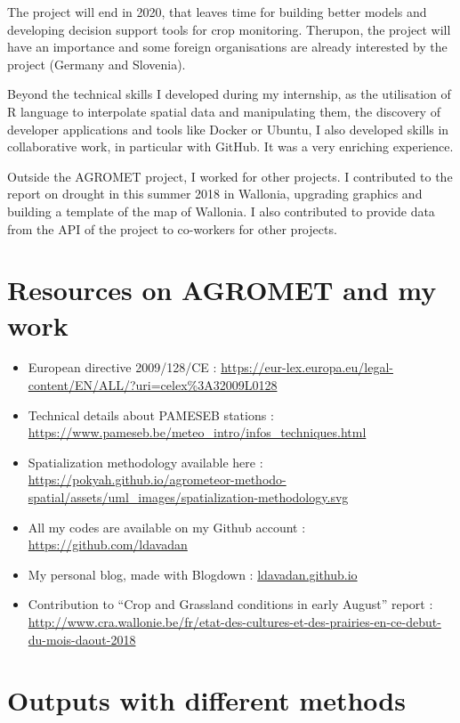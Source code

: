 \documentclass[12pt,twoside]{reedthesis}
\theoremstyle{definition}
\theoremstyle{definition}
\theoremstyle{definition}
\theoremstyle{remark}
\begin{document}
The project will end in 2020, that leaves time for building better
models and developing decision support tools for crop monitoring.
Therupon, the project will have an importance and some foreign
organisations are already interested by the project (Germany and
Slovenia).

Beyond the technical skills I developed during my internship, as the
utilisation of R language to interpolate spatial data and manipulating
them, the discovery of developer applications and tools like Docker or
Ubuntu, I also developed skills in collaborative work, in particular
with GitHub. It was a very enriching experience.

Outside the AGROMET project, I worked for other projects. I contributed
to the report on drought in this summer 2018 in Wallonia, upgrading
graphics and building a template of the map of Wallonia. I also
contributed to provide data from the API of the project to co-workers
for other projects.

\appendix

\chapter{Resources on AGROMET and my
work}\label{resources-on-agromet-and-my-work}
\begin{itemize}
\item
  European directive 2009/128/CE :
  \url{https://eur-lex.europa.eu/legal-content/EN/ALL/?uri=celex\%3A32009L0128}
\item
  Technical details about PAMESEB stations :
  \url{https://www.pameseb.be/meteo_intro/infos_techniques.html}
\item
  Spatialization methodology available here :
  \url{https://pokyah.github.io/agrometeor-methodo-spatial/assets/uml_images/spatialization-methodology.svg}
\item
  All my codes are available on my Github account :
  \url{https://github.com/ldavadan}
\item
  My personal blog, made with Blogdown : \url{ldavadan.github.io}
\item
  Contribution to ``Crop and Grassland conditions in early August''
  report :
  \url{http://www.cra.wallonie.be/fr/etat-des-cultures-et-des-prairies-en-ce-debut-du-mois-daout-2018}
\end{itemize}
\chapter{Outputs with different
methods}\label{outputs-with-different-methods}
\end{document}
